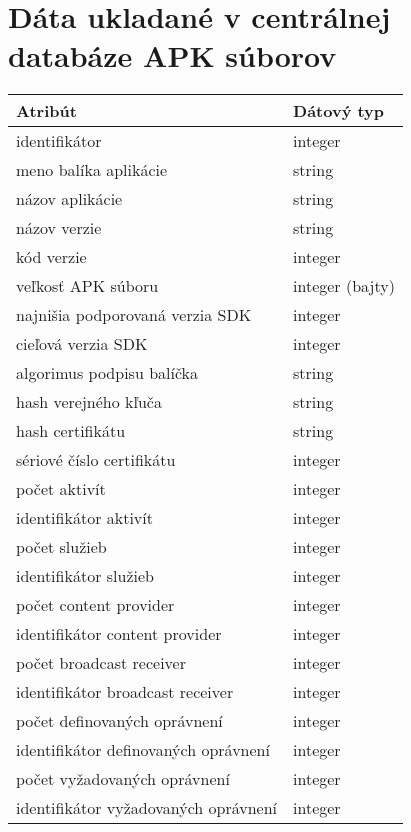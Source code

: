 \chapter{Dáta ukladané v centrálnej databáze APK súborov}
\label{zbieraneDataPriloha}
\begin{longtable}{|l|p{6.3cm}|}
\hline
\textbf{Atribút} & \textbf{Dátový typ}          \\ \hline
identifikátor                                   & integer         \\
meno balíka aplikácie                           & string 		  \\
názov aplikácie                                      & string             \\
názov verzie                                      & string      \\
kód verzie                                      & integer \\
veľkosť APK súboru                                      & integer (bajty)        \\
najnišia podporovaná verzia SDK 			& integer \\
cieľová verzia SDK							& integer \\
algorimus podpisu balíčka					& string \\
hash verejného kľuča 						& string \\
hash certifikátu							& string \\
sériové číslo certifikátu					& integer \\
počet aktivít								& integer \\
identifikátor aktivít								& integer \\
počet služieb								& integer \\
identifikátor služieb								& integer \\
počet content provider								& integer \\
identifikátor content provider								& integer \\
počet broadcast receiver								& integer \\
identifikátor broadcast receiver								& integer \\
počet definovaných oprávnení								& integer \\
identifikátor definovaných oprávnení								& integer \\
počet vyžadovaných oprávnení								& integer \\
identifikátor vyžadovaných oprávnení								& integer \\

\end{longtable}
